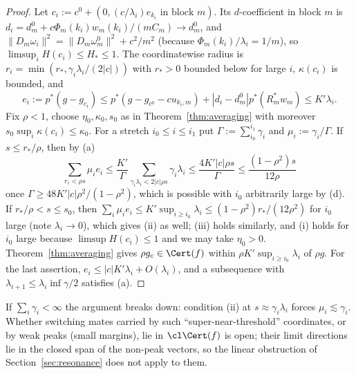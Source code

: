 \begin{proof}
Let $c_i:=c^0+(0,(c/\lambda_i)e_{k_i}\text{ in block }m)$.  Its
$d$-coefficient in block $m$ is $d_{i}=d^0_m+c\Phi_m(k_i)w_m(k_i)/(mC_m)
\to d^0_m$, and $\|D_m\omega_{i}\|^2=\|D_m\omega^0_m\|^2+c^2/m^2$ (because
$\Phi_m(k_i)/\lambda_i=1/m$), so $\limsup_iH(c_i)\le H_*\le1$.  The
coordinatewise radius is $r_i=\min(r_*,\gamma_i\lambda_i/(2|c|))$ with
$r_*>0$ bounded below for large $i$, $\kappa(c_i)$ is bounded, and
\[
 e_i:=p^*(g-g_{c_i})\le p^*(g-g_{c^0}-cu_{k_i,m})+|d_i-d^0_m|p^*(R_m^*w_m)
 \le K'\lambda_i .
\]
Fix $\rho<1$, choose $\eta_0,\kappa_0,s_0$ as in Theorem~\ref{thm:averaging}
with moreover $s_0\sup_i\kappa(c_i)\le\kappa_0$.  For a stretch
$i_0\le i\le i_1$ put $\Gamma:=\sum_{i_0}^{i_1}\gamma_i$ and
$\mu_i:=\gamma_i/\Gamma$.  If $s\le r_*/\rho$, then by (a)
\[
 \sum_{r_i<\rho s}\mu_ie_i\le\frac{K'}{\Gamma}\sum_{\gamma_i\lambda_i<2|c|\rho
 s}\gamma_i\lambda_i\le\frac{4K'|c|\rho s}{\Gamma}\le\frac{(1-\rho^2)s}
 {12\rho}
\]
once $\Gamma\ge48K'|c|\rho^2/(1-\rho^2)$, which is possible with $i_0$
arbitrarily large by (d).  If $r_*/\rho<s\le s_0$, then
$\sum_i\mu_ie_i\le K'\sup_{i\ge i_0}\lambda_i\le(1-\rho^2)r_*/(12\rho^2)$
for $i_0$ large (note $\lambda_i\to0$), which gives (ii) as well; (iii) holds similarly, and (i) holds for
$i_0$ large because $\limsup H(c_i)\le1$ and we may take $\eta_0>0$.
Theorem~\ref{thm:averaging} gives $\rho g_c\in\Cert(f)$ within
$\rho K'\sup_{i\ge i_0}\lambda_i$ of $\rho g$.  For the last assertion,
$e_i\le|c|K'\lambda_i+O(\lambda_i)$, and a subsequence with
$\lambda_{i+1}\le\lambda_i\inf\gamma/2$ satisfies (a).
\end{proof}

\begin{remark}\label{rem:summablegaps}
If $\sum_i\gamma_i<\infty$ the argument breaks down: condition (ii) at
$s\approx\gamma_i\lambda_i$ forces $\mu_i\lesssim\gamma_i$.  Whether
switching mates carried by such ``super-near-threshold'' coordinates, or by
weak peaks (small margins), lie in $\cl\Cert(f)$ is open; their limit
directions lie in the closed span of the non-peak vectors, so the linear
obstruction of Section~\ref{sec:resonance} does not apply to them.
\end{remark}

